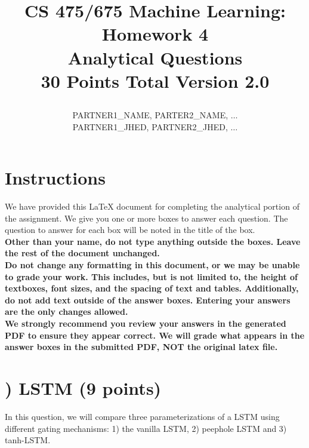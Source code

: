 \documentclass[11pt]{article}
\title{CS 475/675 Machine Learning: Homework 4\\
Analytical Questions\\
\Large{30 Points Total \hspace{1cm} Version 2.0}
\author{PARTNER1\_NAME, PARTER2\_NAME, $\ldots$ \\
PARTNER1\_JHED, PARTNER2\_JHED, $\ldots$}}
\date{}
\newcounter{QuestionCounter}
\newcounter{SubQuestionCounter}[QuestionCounter]
\newcommand{\newquestion}{\stepcounter{QuestionCounter}\setcounter{SubQuestionCounter}{1}\newpage}
\begin{document}
\maketitle
\thispagestyle{headings}


\section*{Instructions }
We have provided this \LaTeX{} document for completing the analytical portion of the assignment. We give you one or more boxes to answer each question.  The question to answer for each box will be noted in the title of the box.\\

{\bf Other than your name, do not type anything outside the boxes. Leave the rest of the document unchanged.}\\


\textbf{Do not change any formatting in this document, or we may be unable to
  grade your work. This includes, but is not limited to, the height of
  textboxes, font sizes, and the spacing of text and tables.  Additionally, do
  not add text outside of the answer boxes. Entering your answers are the only
  changes allowed.}\\


\textbf{We strongly recommend you review your answers in the generated PDF to
  ensure they appear correct. We will grade what appears in the answer boxes in
  the submitted PDF, NOT the original latex file.}

\pagebreak

\newquestion
\section*{) 
LSTM (9 points)} 
In this question, we will compare three parameterizations of a LSTM using different gating mechanisms: 1) the vanilla LSTM, 2) peephole LSTM and 3) tanh-LSTM.
\end{document}

